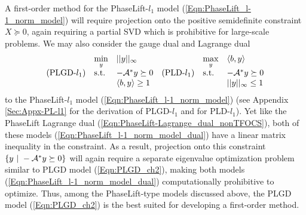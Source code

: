 A first-order method for the PhaseLift-$l_1$ model (\ref{Eqn:PhaseLift_l-1_norm_model}) will require projection onto the positive semidefinite constraint $X \succeq 0$, again requiring a partial SVD which is prohibitive for large-scale problems.  We may also consider the gauge dual and Lagrange dual
\begin{equation} 			\label{Eqn:PhaseLift_l-1_norm_model_dual}
\begin{array}{llllll}

	&	\min\limits_{y}
		&	||y||_\infty
			&&	\max\limits_y
				& \langle b, y \rangle
					\\
			
(\textnormal{PLGD-}l_1)		

	&	\textnormal{s.t.}
		&	-{\mathcal A}^*y \succeq 0
			&(\textnormal{PLD-}l_1)&	\textnormal{s.t.}
				&	- {\mathcal A}^*y \succeq 0
					\\
			
			&&	\langle b, y \rangle \geq 1 &&&	||y||_\infty \leq 1
\end{array}
\end{equation}
to the PhaseLift-$l_1$ model (\ref{Eqn:PhaseLift_l-1_norm_model}) 
(see Appendix \ref{Sec:Appx-PL-l1} for the derivation of PLGD-$l_1$ and  \cite[Chapter 5]{boyd2004convex} for PLD-$l_1$).   
Yet like the PhaseLift Lagrange dual (\ref{Eqn:PhaseLift-Lagrange_dual_nonTFOCS}), 
both of these models (\ref{Eqn:PhaseLift_l-1_norm_model_dual}) have a linear matrix inequality in the constraint.
As a result, projection onto this constraint $\{ y \ | \ -\caA^*y \succeq 0 \}$ will again require a separate eigenvalue optimization problem similar to PLGD model (\ref{Eqn:PLGD_ch2}), making both models (\ref{Eqn:PhaseLift_l-1_norm_model_dual}) computationally prohibitive to optimize.
Thus, among the PhaseLift-type models discussed above, the PLGD model (\ref{Eqn:PLGD_ch2}) is the best suited for developing a first-order method.







